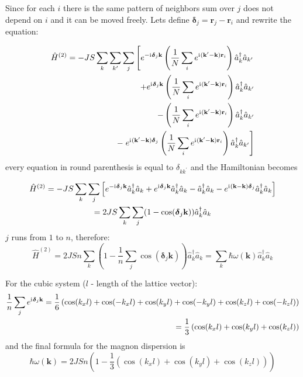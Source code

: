 Since for each $i$ there is the same pattern of neighbors sum over $j$ does not depend on $i$ and it can be moved freely.
Lets define $\boldsymbol{\delta}_j = \mathbf{r}_j - \mathbf{r}_i$ and rewrite the equation:

\begin{equation}
\begin{aligned}
    \hat{H}^{(2)}  = -JS \sum_k\sum_{k^{\prime}}\sum_j \left[
        e^{-\mathrm{i}\mkern1mu\boldsymbol{\delta}_j\mathbf{k}}
        \left(\dfrac{1}{N}\sum_ie^{\mathrm{i}\mkern1mu(\mathbf{k^{\prime}}-\mathbf{k})\mathbf{r}_i}\right) 
        \hat{a}_k^{\dag}\hat{a}_{k^{\prime}}\right. \\
        +
        e^{\mathrm{i}\mkern1mu\boldsymbol{\delta}_j\mathbf{k}}
        \left(\dfrac{1}{N}\sum_ie^{\mathrm{i}\mkern1mu(\mathbf{k^{\prime}}-\mathbf{k})\mathbf{r}_i}\right)
         \hat{a}_k^{\dag}\hat{a}_{k^{\prime}}  \\
        -
        \left(\dfrac{1}{N}\sum_ie^{\mathrm{i}\mkern1mu(\mathbf{k^{\prime}}-\mathbf{k})\mathbf{r}_i}\right)
        \hat{a}_k^{\dag}\hat{a}_{k^{\prime}}  \\
        -
        \left.e^{\mathrm{i}\mkern1mu(\mathbf{k^{\prime}}-\mathbf{k})\boldsymbol{\delta}_j}
        \left(\dfrac{1}{N}\sum_ie^{\mathrm{i}\mkern1mu(\mathbf{k^{\prime}}-\mathbf{k})\mathbf{r}_i}\right)
        \hat{a}_k^{\dag}\hat{a}_{k^{\prime}} \right]
\end{aligned}
\end{equation}
every equation in round parenthesis is equal to $\delta_{kk^{\prime}}$ and the Hamiltonian becomes

\begin{multline}
    \hat{H}^{(2)} = -JS\sum_k\sum_j\left[e^{-\mathrm{i}\mkern1mu\boldsymbol{\delta}_j\mathbf{k}}
    \hat{a}_k^{\dag}\hat{a}_k
    +
    e^{\mathrm{i}\mkern1mu\boldsymbol{\delta}_j\mathbf{k}}
     \hat{a}_k^{\dag}\hat{a}_k 
    -
    \hat{a}_k^{\dag}\hat{a}_k 
    -
    e^{\mathrm{i}\mkern1mu(\mathbf{k}-\mathbf{k})\boldsymbol{\delta}_j}
    \hat{a}_k^{\dag}\hat{a}_k\right] \\
     = 2JS\sum_k\sum_j(1 - \cos(\boldsymbol{\delta}_j\mathbf{k}))\hat{a}_k^{\dag}\hat{a}_k
\end{multline}
$j$ runs from $1$ to $n$, therefore:
\begin{equation}
    \hat{H}^{(2)} = 2JSn\sum_k\left(1 - \dfrac{1}{n}\sum_j
    \cos(\boldsymbol{\delta}_j\mathbf{k})\right)\hat{a}_k^{\dag}\hat{a}_k = 
    \sum_k \hbar\omega(\mathbf{k})\hat{a}_k^{\dag}\hat{a}_k
\end{equation}

For the cubic system ($l$ - length of the lattice vector):
\begin{align}
    \dfrac{1}{n}\sum_j
    e^{\mathrm{i}\mkern1mu\boldsymbol{\delta}_j\mathbf{k}}  = \dfrac{1}{6}\left(\cos(k_xl) + \cos(-k_xl) + \cos(k_yl) + \cos(-k_yl) + \cos(k_zl) + \cos(-k_zl)\right) \\
    = \dfrac{1}{3}\left(\cos(k_x l) + \cos(k_y l) + \cos(k_z l)\right)
\end{align}
and the final formula for the magnon dispersion is
\begin{equation}
    \hbar\omega(\mathbf{k}) = 2JSn\left(1 - 
    \dfrac{1}{3}\left(\cos(k_x l) + \cos(k_y l) + \cos(k_z l)\right)\right)
\end{equation}